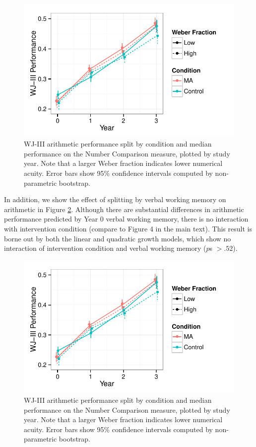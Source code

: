 \documentclass[11pt]{article}
\begin{document}
\begin{figure}[H]
\begin{center}
\includegraphics[width=4.5in]{figures/wj_by_ans.pdf}
\end{center}
\caption{WJ-III arithmetic performance split by condition and median performance on the Number Comparison measure, plotted by study year. Note that a larger Weber fraction indicates lower numerical acuity. Error bars show 95\% confidence intervals computed by non-parametric bootstrap.}
\label{fig:wj3ans}
\end{figure}

In addition, we show the effect of splitting by verbal working memory on arithmetic in Figure \ref{fig:arithvwm}. Although there are substantial differences in arithmetic performance predicted by Year 0 verbal working memory, there is no interaction with intervention condition (compare to Figure 4 in the main text). This result is borne out by both the linear and quadratic growth models, which show no interaction of intervention condition and verbal working memory ($p$s $> .52$).

\begin{figure}[H]
\begin{center}
\includegraphics[width=4.5in]{figures/wj_by_ans.pdf}
\end{center}
\caption{WJ-III arithmetic performance split by condition and median performance on the Number Comparison measure, plotted by study year. Note that a larger Weber fraction indicates lower numerical acuity. Error bars show 95\% confidence intervals computed by non-parametric bootstrap.}
\label{fig:arithvwm}
\end{figure}
\end{document}
